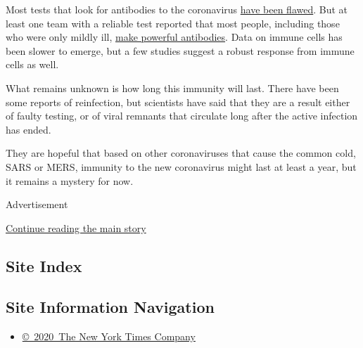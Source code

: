 Most tests that look for antibodies to the coronavirus
\href{https://www.nytimes3xbfgragh.onion/2020/04/24/health/coronavirus-antibody-tests.html}{have
been flawed}. But at least one team with a reliable test reported that
most people, including those who were only mildly ill,
\href{https://www.nytimes3xbfgragh.onion/2020/05/07/health/coronavirus-antibody-prevalence.html}{make
powerful antibodies}. Data on immune cells has been slower to emerge,
but a few studies suggest a robust response from immune cells as well.

What remains unknown is how long this immunity will last. There have
been some reports of reinfection, but scientists have said that they are
a result either of faulty testing, or of viral remnants that circulate
long after the active infection has ended.

They are hopeful that based on other coronaviruses that cause the common
cold, SARS or MERS, immunity to the new coronavirus might last at least
a year, but it remains a mystery for now.

Advertisement

\protect\hyperlink{after-bottom}{Continue reading the main story}

\hypertarget{site-index}{%
\subsection{Site Index}\label{site-index}}

\hypertarget{site-information-navigation}{%
\subsection{Site Information
Navigation}\label{site-information-navigation}}

\begin{itemize}
\tightlist
\item
  \href{https://help.nytimes3xbfgragh.onion/hc/en-us/articles/115014792127-Copyright-notice}{©~2020~The
  New York Times Company}
\end{itemize}

